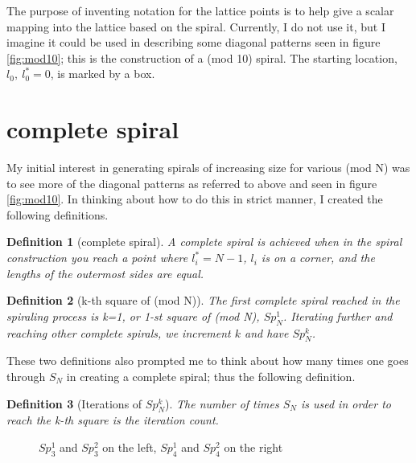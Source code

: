 \documentclass[11pt]{amsart}
\theoremstyle{mydef}
\newtheorem{definition}{Definition}
\begin{document}
The purpose of inventing notation for the lattice points is to help give a scalar mapping into the lattice based on the spiral. Currently, I do not use it, but I imagine it could be used in describing some diagonal patterns seen in figure \ref{fig:mod10}; this is the construction of a (mod 10) spiral. The starting location, $l_0,\ l^*_0 = 0$, is marked by a box.



\section{complete spiral}
My initial interest in generating spirals of increasing size for various (mod N) was to see more of the diagonal patterns as referred to above and seen in figure \ref{fig:mod10}. In thinking about how to do this in strict manner, I created the following definitions.

\begin{definition}[complete spiral]
A complete spiral is achieved when in the spiral construction you reach a point where $l^*_i = N-1$, $l_i$ is on a corner, and the lengths of the outermost sides are equal.
\end{definition}

\begin{definition}[k-th square of (mod N)]
The first complete spiral reached in the spiraling process is k=1, or 1-st square of (mod N),  $Sp^1_N$. Iterating further and reaching other complete spirals, we increment $k$ and have $Sp^k_N$.
\end{definition}

These two definitions also prompted me to think about how many times one goes through $S_N$ in creating a complete spiral; thus the following definition.

\begin{definition}[Iterations of $Sp^k_N$]
The number of times $S_N$ is used in order to reach the k-th square is the iteration count.
\end{definition}

\begin{figure}[h]
\centering
{}
\caption{$Sp^1_3$ and $Sp^2_3$ on the left, $Sp^1_4$ and $Sp^2_4$ on the right}
\label{fig:mod34}
\end{figure}
\end{document}
